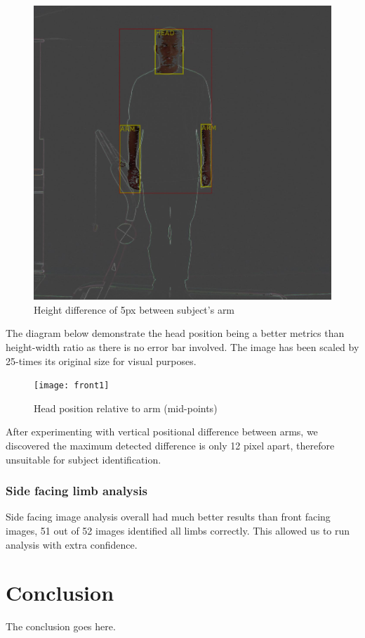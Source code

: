 \documentclass[10pt,journal,compsoc]{IEEEtran}
\begin{document}
\begin{figure}[!htb]
    \centering
    \includegraphics[width=0.8\linewidth]{frontFacing}
    \caption{Height difference of 5px between subject's arm}
\end{figure}

The diagram below demonstrate the head position being a better metrics than height-width ratio as there is no error bar involved. The image has been scaled by 25-times its original size for visual purposes.

\begin{figure}[!htb]
\centering
\texttt{[image: front1]}
    \caption{Head position relative to arm (mid-points)}
\end{figure}

After experimenting with vertical positional difference between arms, we discovered the maximum detected difference is only 12 pixel apart, therefore unsuitable for subject identification.




\subsubsection{Side facing limb analysis}
Side facing image analysis overall had much better results than front facing images, 51 out of 52 images identified all limbs correctly. This allowed us to run analysis with extra confidence. 


\section{Conclusion}
The conclusion goes here.
\end{document}
